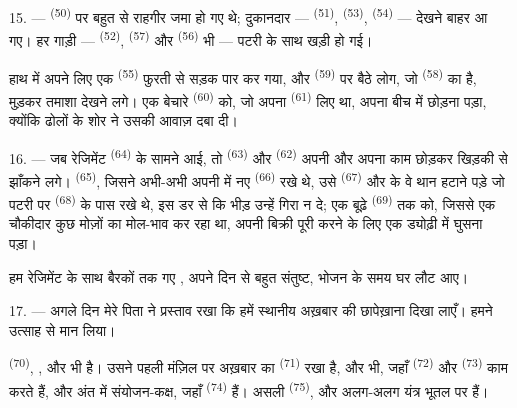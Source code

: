 15. ---  \textsuperscript{(50)} पर बहुत से राहगीर जमा हो गए थे;
दुकानदार —  \textsuperscript{(51)}, 
\textsuperscript{(53)},  \textsuperscript{(54)} — 
देखने बाहर आ गए। हर गाड़ी —  \textsuperscript{(52)},
 \textsuperscript{(57)} और 
\textsuperscript{(56)} भी — पटरी के साथ खड़ी हो गई।

\VUsaut{3.0mm}

हाथ में अपने  लिए एक 
\textsuperscript{(55)} फुरती से सड़क पार कर गया, और 
\textsuperscript{(59)} पर बैठे लोग, जो  \textsuperscript{(58)} का
है, मुड़कर तमाशा देखने लगे। एक बेचारे  \textsuperscript{(60)} को, जो अपना
 \textsuperscript{(61)} लिए था, अपना  बीच में
छोड़ना पड़ा, क्योंकि ढोलों के शोर ने उसकी आवाज़ दबा दी।

16. --- जब रेजिमेंट  \textsuperscript{(64)} के सामने आई, तो
 \textsuperscript{(63)} और 
\textsuperscript{(62)} अपनी  और अपना काम छोड़कर खिड़की से
झाँकने लगे।  \textsuperscript{(65)}, जिसने अभी-अभी अपनी
 में नए  \textsuperscript{(66)} रखे थे, उसे
 \textsuperscript{(67)} और  के वे थान हटाने पड़े जो
पटरी पर  \textsuperscript{(68)} के पास रखे थे, इस डर से कि भीड़ उन्हें
गिरा न दे; एक बूढ़े  \textsuperscript{(69)} तक को, जिससे एक चौकीदार
कुछ मोज़ों का मोल-भाव कर रहा था, अपनी बिक्री पूरी करने के लिए एक ड्योढ़ी में घुसना
पड़ा।

हम रेजिमेंट के साथ बैरकों तक गए , अपने दिन से बहुत संतुष्ट, भोजन के
समय घर लौट आए।

\VUsaut{3.0mm}

17. --- अगले दिन मेरे पिता ने प्रस्ताव रखा कि हमें स्थानीय अख़बार की छापेख़ाना
दिखा लाएँ। हमने उत्साह से मान लिया।

  \textsuperscript{(70)},
,  और  भी है।
उसने पहली मंज़िल पर अख़बार का  \textsuperscript{(71)} रखा है,
और  भी, जहाँ  \textsuperscript{(72)} और
 \textsuperscript{(73)} काम करते हैं, और अंत में
संयोजन-कक्ष, जहाँ  \textsuperscript{(74)} हैं। असली
 \textsuperscript{(75)},  और अलग-अलग
यंत्र भूतल पर हैं।

